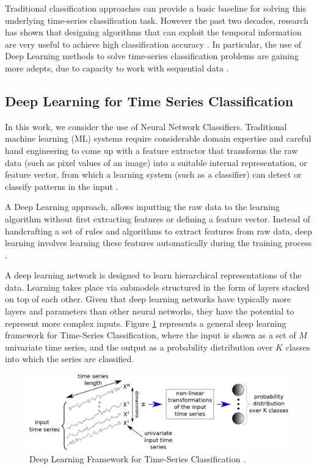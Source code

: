 Traditional classification approaches can provide a basic baseline for solving this underlying time-series classification task. However the past two decades, research has shown that designing algorithms that can exploit the temporal information are very useful to achieve high classification accuracy \cite{Wang2017}. In particular, the use of Deep Learning methods to solve time-series classification problems are gaining more adepts, due to capacity to work with sequential data \cite{Bagnall2017a, Zhao2017, Zebik2017}.

\subsection{Deep Learning for Time Series Classification}
\label{Sec:DL-TSC}
In this work, we consider the use of Neural Network Classifiers. Traditional machine learning (ML) systems require considerable domain expertise and careful hand engineering to come up with a feature extractor that transforms the raw data (such as pixel values of an image) into a suitable internal representation, or feature vector, from which a learning system (such as a classifier) can detect or classify patterns in the input \cite{Guyon2006}. 

A Deep Learning approach, allows inputting the raw data to the learning algorithm without first extracting features or defining a feature vector. Instead of handcrafting a set of rules and algorithms to extract features from raw data, deep learning involves learning these features automatically during the training process \cite{Goodfellow2016, Schmidhuber2015}. 

A deep learning network is designed to learn hierarchical representations of the data. Learning takes place via submodels structured in the form of layers stacked on top of each other. Given that deep learning networks have typically more layers and parameters than other neural networks, they have the potential to represent more complex inputs. Figure \ref{Fig:TSC-Fawaz} represents a general deep learning framework for Time-Series Classification, where the input is shown as a set of $M$ univariate time series, and the output as a probability distribution over $K$ classes into which the series are classified.

\begin{figure}[htb]
 	\centering
 	\includegraphics[scale=0.5]{../Figures/TSC_Fawaz}
 	\caption{Deep Learning Framework for Time-Series Classification \cite{Fawaz2019}.}
 	\label{Fig:TSC-Fawaz}
\end{figure}

